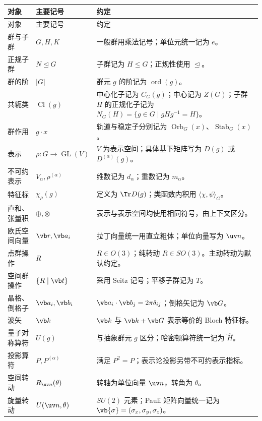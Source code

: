 \begin{longtable}{p{}p{}p{}}
\toprule
对象 & 主要记号 & 约定 \\
\midrule
\endfirsthead
\toprule
对象 & 主要记号 & 约定 \\
\midrule
\endhead
群与子群 & $G,H,K$ & 一般群用乘法记号；单位元统一记为 $e$。 \\
正规子群 & $N\mathrel{\trianglelefteq} G$ & 子群记为 $H\leqslant G$；正规性使用 $\trianglelefteq$。 \\
群的阶 & $|G|$ & 群元 $g$ 的阶记为 $\operatorname{ord}(g)$。 \\
共轭类 & $\operatorname{Cl}(g)$ & 中心化子记为 $C_G(g)$；中心记为 $Z(G)$；子群 $H$ 的正规化子记为 $N_G(H)=\{g\in G\mid gHg^{-1}=H\}$。 \\
群作用 & $g\cdot x$ & 轨道与稳定子分别记为 $\operatorname{Orb}_G(x)$、$\operatorname{Stab}_G(x)$。 \\
表示 & $\rho:G\to\operatorname{GL}(V)$ & $V$ 为表示空间；具体基下矩阵写为 $D(g)$ 或 $D^{(\alpha)}(g)$。 \\
不可约表示 & $V_\alpha,\rho^{(\alpha)}$ & 维数记为 $d_\alpha$；重数记为 $m_\alpha$。 \\
特征标 & $\chi_\rho(g)$ & 定义为 $\Tr D(g)$；类函数内积用 $\langle\chi,\psi\rangle_G$。 \\
直和、张量积 & $\oplus,\otimes$ & 表示与表示空间均使用相同符号，由上下文区分。 \\
欧氏空间向量 & $\vb r,\vb a_i$ & 拉丁向量统一用直立粗体；单位向量写为 $\uv n$。 \\
点群操作 & $R$ & $R\in O(3)$；纯转动 $R\in SO(3)$。主动转动为默认约定。 \\
空间群操作 & $\{R\mid\vb t\}$ & 采用 Seitz 记号；平移子群记为 $T$。 \\
晶格、倒格子 & $\vb a_i,\vb b_i$ & $\vb a_i\cdot\vb b_j=2\pi\delta_{ij}$；倒格矢记为 $\vb G$。 \\
波矢 & $\vb k$ & $\vb k$ 与 $\vb k+\vb G$ 表示等价的 Bloch 特征标。 \\
量子对称算符 & $U(g)$ & 与抽象群元 $g$ 区分；哈密顿算符统一记为 $\hat H$。 \\
投影算符 & $P,P^{(\alpha)}$ & 满足 $P^2=P$；表示论投影另带不可约表示指标。 \\
空间转动 & $R_{\uv n}(\theta)$ & 转轴为单位向量 $\uv n$，转角为 $\theta$。 \\
旋量转动 & $U(\uv n,\theta)$ & $SU(2)$ 元素；Pauli 矩阵向量统一记为 $\vb{\sigma}=(\sigma_x,\sigma_y,\sigma_z)$。 \\

\end{longtable}
